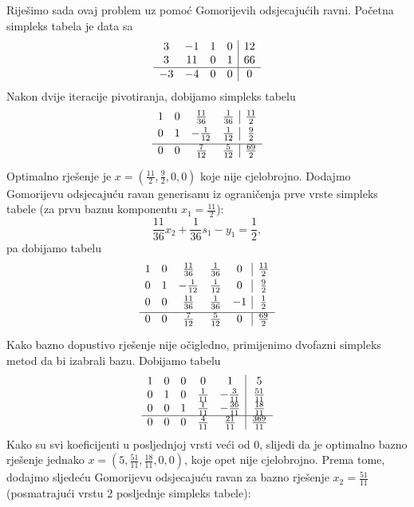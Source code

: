 \documentclass[b5paper, utf8, 11pt, colorlinks]{book}
\theoremstyle{definition}
\begin{document}
Riješimo sada ovaj problem uz pomoć Gomorijevih odsjecajućih ravni. 
Početna simpleks tabela je data sa 
$$\begin{array}{ccc c| c}
    3  & -1 & 1 &  0  & 12  \\
    3  & 11 & 0 &  1  & 66 \\ \hline
   -3  & -4 & 0 &  0  & 0
\end{array}$$
Nakon dvije iteracije pivotiranja, dobijamo simpleks tabelu 
$$\begin{array}{ccc c| c}\vspace{1mm}
1 & 0 &  \frac{11}{36}   &  \frac{1}{36}  &  \frac{11}{2} \\\vspace{1mm}
0 & 1 &  -\frac{1}{12}  &  \frac{1}{12}  &  \frac{9}{2}   \\ \hline\vspace{1mm}
0 & 0 &  \frac{7}{12}   &  \frac{5}{12}  &  \frac{69}{2}
\end{array} $$
Optimalno rješenje je $x = (\frac{11}{2}, \frac{9}{2}, 0, 0)$ koje nije cjelobrojno. Dodajmo Gomorijevu odsjecajuću ravan generisanu iz ograničenja prve vrste simpleks tabele (za prvu baznu komponentu $x_1 = \frac{11}{2}$):
$$  \frac{11}{36} x_2 + \frac{1}{36} s_1 - y_1 = \frac{1}{2},$$
pa dobijamo tabelu 
$$\begin{array}{ccccc| c}\vspace{1mm}
1 &  0 &   \frac{11}{36}  & \frac{1}{36}   &  0 & \frac{11}{2} \\\vspace{1mm}
0 &  1 &   -\frac{1}{12}  & \frac{1}{12}   &  0 & \frac{9}{2} \\\vspace{1mm}
0 &  0 &  \frac{11}{36}   &  \frac{1}{36}  & -1 & \frac{1}{2} \\ \hline\vspace{1mm}
0 & 0  &  \frac{7}{12}    & \frac{5}{12}   &  0 & \frac{69}{2}
\end{array} $$
Kako bazno dopustivo rješenje nije očigledno, primijenimo dvofazni simpleks metod da bi izabrali bazu. Dobijamo tabelu
$$\begin{array}{ccccc| c}
1   &   0       &   0   &   0             & 1              & 5 \\
0   &   1       &   0   &   \frac{1}{11}  & -\frac{3}{11}  & \frac{51}{11} \\
0   &   0       &   1   &   \frac{1}{11}  & -\frac{36}{11} &  \frac{18}{11} \\ \hline
0   &   0       &   0   &   \frac{4}{11}  & \frac{21}{11}  &  \frac{369}{11} \\
\end{array} $$
Kako su svi koeficijenti u posljednjoj vrsti veći od 0, slijedi da je optimalno bazno rješenje jednako $x=(5, \frac{51}{11}, \frac{18}{11}, 0, 0)$, koje opet nije cjelobrojno. 
 Prema tome, dodajmo sljedeću Gomorijevu odsjecajuću ravan za bazno rješenje $x_2 = \frac{51}{11}$ (posmatrajući vrstu 2 posljednje simpleks tabele):
 
\end{document}
